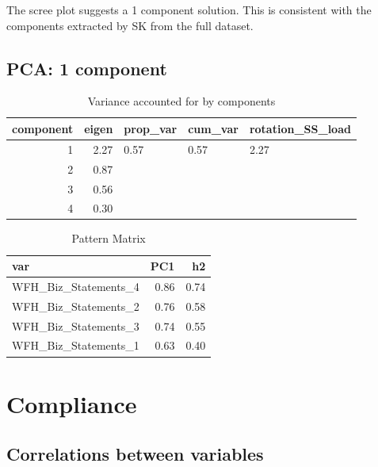 \documentclass[]{article}
\begin{document}
The scree plot suggests a 1 component solution. This is consistent with
the components extracted by SK from the full dataset.

\hypertarget{pca-1-component}{%
\subsection{PCA: 1 component}\label{pca-1-component}}

\begin{table}[H]

\caption{\label{tab:unnamed-chunk-11}Variance accounted for by components}
\centering
\fontsize{6}{8}\selectfont
\begin{tabular}[t]{rrlll}
\toprule
component & eigen & prop\_var & cum\_var & rotation\_SS\_load\\
\midrule
1 & 2.27 & 0.57 & 0.57 & 2.27\\
2 & 0.87 &  &  & \\
3 & 0.56 &  &  & \\
4 & 0.30 &  &  & \\
\bottomrule
\end{tabular}
\end{table}

\begin{table}[H]

\caption{\label{tab:unnamed-chunk-11}Pattern Matrix}
\centering
\fontsize{6}{8}\selectfont
\begin{tabular}[t]{lrr}
\toprule
var & PC1 & h2\\
\midrule
WFH\_Biz\_Statements\_4 & 0.86 & 0.74\\
WFH\_Biz\_Statements\_2 & 0.76 & 0.58\\
WFH\_Biz\_Statements\_3 & 0.74 & 0.55\\
WFH\_Biz\_Statements\_1 & 0.63 & 0.40\\
\bottomrule
\end{tabular}
\end{table}

\newpage

\hypertarget{compliance}{%
\section{Compliance}\label{compliance}}

\hypertarget{correlations-between-variables-2}{%
\subsection{Correlations between
variables}\label{correlations-between-variables-2}}
\end{document}
